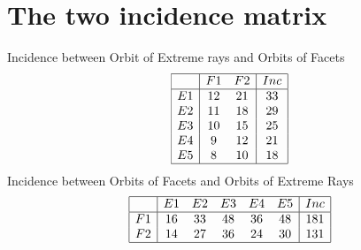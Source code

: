 \documentclass[12pt]{article}
\begin{document}
\section{The two incidence matrix}
Incidence between Orbit of Extreme rays and Orbits of Facets
\begin{equation*}
\begin{array}{|c|cc|c|}
\hline
&F1&F2&Inc\\
\hline
E1&12&21&33\\
E2&11&18&29\\
E3&10&15&25\\
E4&9&12&21\\
E5&8&10&18\\
\hline
\end{array}
\end{equation*}
Incidence between Orbits of Facets and Orbits of Extreme Rays
\begin{equation*}
\begin{array}{|c|ccccc|c|}
\hline
&E1&E2&E3&E4&E5&Inc\\
\hline
F1&16&33&48&36&48&181\\
F2&14&27&36&24&30&131\\
\hline
\end{array}
\end{equation*}
\end{document}
